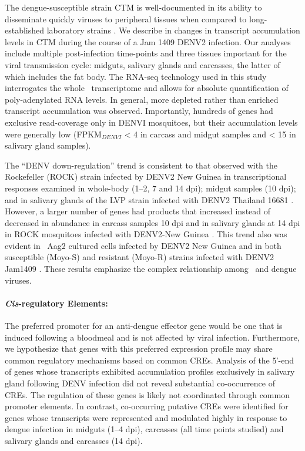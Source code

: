 The dengue-susceptible strain \gls{CTM} is well-documented in its ability to disseminate quickly viruses to peripheral tissues when compared to long-established laboratory strains \cite{Salazar2007}.
We describe in \citet{bonizzoni2012complex} changes in transcript accumulation levels in \gls{CTM} during the course of a Jam 1409 \gls{DENV}2 infection.
Our analyses include multiple post-infection time-points and three tissues important for the viral transmission cycle: midguts, salivary glands and carcasses, the latter of which includes the fat body.
The RNA-seq technology used in this study interrogates the whole \Aa\ transcriptome and allows for absolute quantification of poly-adenylated RNA levels.
In general, more depleted rather than enriched transcript accumulation was observed.
Importantly, hundreds of genes had exclusive read-coverage only in \gls{DENVI} mosquitoes, but their accumulation levels were generally low (FPKM$_{DENVI}$ < 4 in carcass and midgut samples and < 15 in salivary gland samples).

The “\gls{DENV} down-regulation” trend is consistent to that observed with the Rockefeller (ROCK) strain infected by \gls{DENV}2 New Guinea in transcriptional responses examined in whole-body (1–2, 7 and 14 \gls{dpi}); midgut samples (10 \gls{dpi}); and in salivary glands of the \gls{LVP} strain infected with \gls{DENV}2 Thailand 16681 \cite{Xi2008,Luplertlop2011,Sim2012,Colpitts2011}.
However, a larger number of genes had products that increased instead of decreased in abundance in carcass samples 10 \gls{dpi} and in salivary glands at 14 \gls{dpi} in ROCK mosquitoes infected with \gls{DENV}2-New Guinea \cite{Xi2008,Sim2012}.
This trend also was evident in \Aa\ Aag2 cultured cells infected by \gls{DENV}2 New Guinea and in both susceptible (Moyo-S) and resistant (Moyo-R) strains infected with \gls{DENV}2 Jam1409 \cite{Sim2010,Behura2011}.
These results emphasize the complex relationship among \Aa\ and dengue viruses.



\paragraph*{\textit{Cis}-regulatory Elements:}

The preferred promoter for an anti-dengue effector gene would be one that is induced following a bloodmeal and is not affected by viral infection.
Furthermore, we hypothesize that genes with this preferred expression profile may share common regulatory mechanisms based on common \glspl{CRE}.
Analysis of the 5′-end of genes whose transcripts exhibited accumulation profiles exclusively in salivary gland following \gls{DENV} infection did not reveal substantial co-occurrence of \glspl{CRE}.
The regulation of these genes is likely not coordinated through common promoter elements.
In contrast, co-occurring putative \glspl{CRE} were identified for genes whose transcripts were represented and modulated highly in response to dengue infection in midguts (1–4 \gls{dpi}), carcasses (all time points studied) and salivary glands and carcasses (14 \gls{dpi}).


